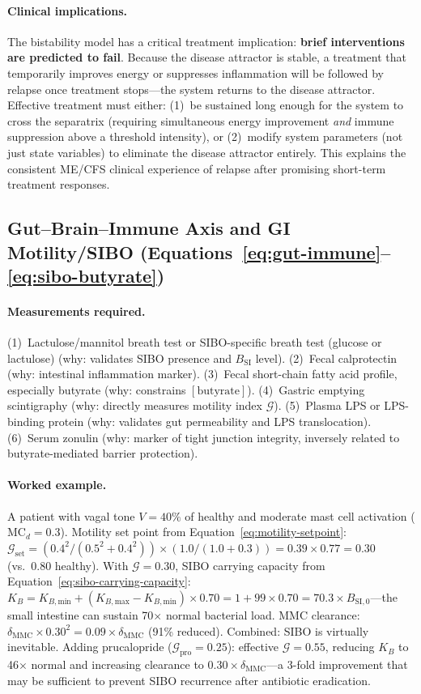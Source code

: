 \paragraph{Clinical implications.}
The bistability model has a critical treatment implication: \textbf{brief interventions are predicted to fail}. Because the disease attractor is stable, a treatment that temporarily improves energy or suppresses inflammation will be followed by relapse once treatment stops---the system returns to the disease attractor. Effective treatment must either: (1)~be sustained long enough for the system to cross the separatrix (requiring simultaneous energy improvement \emph{and} immune suppression above a threshold intensity), or (2)~modify system parameters (not just state variables) to eliminate the disease attractor entirely. This explains the consistent ME/CFS clinical experience of relapse after promising short-term treatment responses.

\subsection{Gut--Brain--Immune Axis and GI Motility/SIBO (Equations~\ref{eq:gut-immune}--\ref{eq:sibo-butyrate})}

\paragraph{Measurements required.}
(1)~Lactulose/mannitol breath test or SIBO-specific breath test (glucose or lactulose) (why: validates SIBO presence and $B_{\text{SI}}$ level).
(2)~Fecal calprotectin (why: intestinal inflammation marker).
(3)~Fecal short-chain fatty acid profile, especially butyrate (why: constrains $[\text{butyrate}]$).
(4)~Gastric emptying scintigraphy (why: directly measures motility index $\mathcal{G}$).
(5)~Plasma LPS or LPS-binding protein (why: validates gut permeability and LPS translocation).
(6)~Serum zonulin (why: marker of tight junction integrity, inversely related to butyrate-mediated barrier protection).

\paragraph{Worked example.}
A patient with vagal tone $V = 40\%$ of healthy and moderate mast cell activation ($\text{MC}_d = 0.3$). Motility set point from Equation~\ref{eq:motility-setpoint}: $\mathcal{G}_{\text{set}} = (0.4^2 / (0.5^2 + 0.4^2)) \times (1.0 / (1.0 + 0.3)) = 0.39 \times 0.77 = 0.30$ (vs.\ 0.80 healthy). With $\mathcal{G} = 0.30$, SIBO carrying capacity from Equation~\ref{eq:sibo-carrying-capacity}: $K_B = K_{B,\text{min}} + (K_{B,\text{max}} - K_{B,\text{min}}) \times 0.70 = 1 + 99 \times 0.70 = 70.3 \times B_{\text{SI},0}$---the small intestine can sustain 70$\times$ normal bacterial load. MMC clearance: $\delta_{\text{MMC}} \times 0.30^2 = 0.09 \times \delta_{\text{MMC}}$ (91\% reduced). Combined: SIBO is virtually inevitable. Adding prucalopride ($\mathcal{G}_{\text{pro}} = 0.25$): effective $\mathcal{G} = 0.55$, reducing $K_B$ to 46$\times$ normal and increasing clearance to $0.30 \times \delta_{\text{MMC}}$---a 3-fold improvement that may be sufficient to prevent SIBO recurrence after antibiotic eradication.

